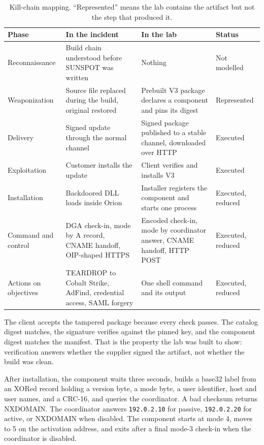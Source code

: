 \begin{table}[H]
\centering
\footnotesize
\caption{Kill-chain mapping. ``Represented'' means the lab contains the artifact but not the step that produced it.}
\label{tab:killchain}
\begin{tabular}{@{}>{\RaggedRight}p{2.3cm}>{\RaggedRight}p{4.7cm}>{\RaggedRight}p{4.7cm}>{\RaggedRight}p{2.5cm}@{}}
\toprule
\textbf{Phase} & \textbf{In the incident} & \textbf{In the lab} & \textbf{Status} \\
\midrule
Reconnaissance & Build chain understood before SUNSPOT was written~\cite{crowdstrike-sunspot} & Nothing & Not modelled \\
Weaponization & Source file replaced during the build, original restored~\cite{crowdstrike-sunspot} & Prebuilt V3 package declares a component and pins its digest & Represented \\
Delivery & Signed update through the normal channel~\cite{mandiant-campaign} & Signed package published to a stable channel, downloaded over HTTP & Executed \\
Exploitation & Customer installs the update & Client verifies and installs V3 & Executed \\
Installation & Backdoored DLL loads inside Orion & Installer registers the component and starts one process & Executed, reduced \\
Command and control & DGA check-in, mode by A record, CNAME handoff, OIP-shaped HTTPS & Encoded check-in, mode by coordinator answer, CNAME handoff, HTTP POST & Executed, reduced \\
Actions on objectives & TEARDROP to Cobalt Strike, AdFind, credential access, SAML forgery & One shell command and its output & Executed, reduced \\
\bottomrule
\end{tabular}
\end{table}

The client accepts the tampered package because every check passes. The catalog digest matches, the signature verifies against the pinned key, and the component digest matches the manifest. That is the property the lab was built to show: verification answers whether the supplier signed the artifact, not whether the build was clean.

After installation, the component waits three seconds, builds a base32 label from an XORed record holding a version byte, a mode byte, a user identifier, host and user names, and a CRC-16, and queries the coordinator. A bad checksum returns NXDOMAIN. The coordinator answers \texttt{192.0.2.10} for passive, \texttt{192.0.2.20} for active, or NXDOMAIN when disabled. The component starts at mode 4, moves to 5 on the activation address, and exits after a final mode-3 check-in when the coordinator is disabled.


